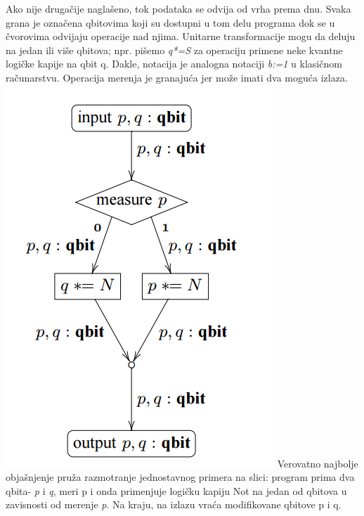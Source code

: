 \documentclass[a4paper]{article}
\begin{document}
{Ako nije drugačije naglašeno, tok podataka se odvija od vrha prema dnu. Svaka grana je označena qbitovima koji su dostupni u tom delu programa dok se u čvorovima odvijaju operacije nad njima. Unitarne transformacije mogu da deluju na jedan ili više qbitova; npr. pišemo \textit{q*=S} za operaciju primene neke kvantne logičke kapije na qbit q. Dakle, notacija je analogna notaciji \textit{b:=1} u klasičnom računarstvu. Operacija merenja je granajuća jer može imati dva moguća izlaza.
\includegraphics{qFlow}
Verovatno najbolje objašnjenje pruža razmotranje jednostavnog primera na slici: program prima dva qbita- \textit{p} i \textit{q}, meri p i onda primenjuje logičku kapiju Not na jedan od qbitova u zavisnosti od merenje \textit{p}. Na kraju, na izlazu vraća modifikovane qbitove p i q.

}
\end{document}
